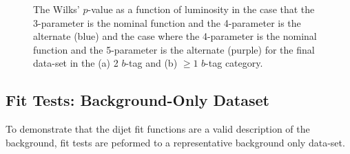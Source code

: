 \begin{figure}[!ht]
  \begin{center}
    \captionsetup[subfigure]{aboveskip=0pt,justification=centering}
  \end{center}
  \caption{The Wilks' $p$-value as a function of luminosity
    in the case that the 3-parameter is the nominal function and the 4-parameter is the alternate (blue)
    and the case where the 4-parameter is the nominal function and the 5-parameter is the alternate (purple)
    for the final data-set in the (a) 2 $b$-tag and (b) $\geq1$ $b$-tag category.
  }
  \label{fig:bkg-summer-wilks}
\end{figure}

\subsection{Fit Tests: Background-Only Dataset}
\label{sec:bkg-summer_fitCR}

To demonstrate that the dijet fit functions are a valid description of the background,
fit tests are peformed to a representative background only data-set.

